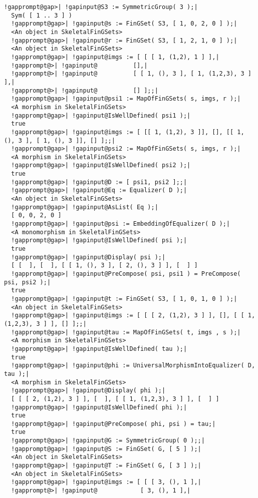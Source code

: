 \documentclass[a4paper,11pt]{report}
\begin{document}
{{{\begin{Verbatim}[commandchars=!@|,fontsize=\small,frame=single,label=Example]
  !gapprompt@gap>| !gapinput@S3 := SymmetricGroup( 3 );|
  Sym( [ 1 .. 3 ] )
  !gapprompt@gap>| !gapinput@s := FinGSet( S3, [ 1, 0, 2, 0 ] );|
  <An object in SkeletalFinGSets>
  !gapprompt@gap>| !gapinput@r := FinGSet( S3, [ 1, 2, 1, 0 ] );|
  <An object in SkeletalFinGSets>
  !gapprompt@gap>| !gapinput@imgs := [ [ [ 1, (1,2), 1 ] ],|
  !gapprompt@>| !gapinput@          [],|
  !gapprompt@>| !gapinput@          [ [ 1, (), 3 ], [ 1, (1,2,3), 3 ] ],|
  !gapprompt@>| !gapinput@          [] ];;|
  !gapprompt@gap>| !gapinput@psi1 := MapOfFinGSets( s, imgs, r );|
  <A morphism in SkeletalFinGSets>
  !gapprompt@gap>| !gapinput@IsWellDefined( psi1 );|
  true
  !gapprompt@gap>| !gapinput@imgs := [ [[ 1, (1,2), 3 ]], [], [[ 1, (), 3 ], [ 1, (), 3 ]], [] ];;|
  !gapprompt@gap>| !gapinput@psi2 := MapOfFinGSets( s, imgs, r );|
  <A morphism in SkeletalFinGSets>
  !gapprompt@gap>| !gapinput@IsWellDefined( psi2 );|
  true
  !gapprompt@gap>| !gapinput@D := [ psi1, psi2 ];;|
  !gapprompt@gap>| !gapinput@Eq := Equalizer( D );|
  <An object in SkeletalFinGSets>
  !gapprompt@gap>| !gapinput@AsList( Eq );|
  [ 0, 0, 2, 0 ]
  !gapprompt@gap>| !gapinput@psi := EmbeddingOfEqualizer( D );|
  <A monomorphism in SkeletalFinGSets>
  !gapprompt@gap>| !gapinput@IsWellDefined( psi );|
  true
  !gapprompt@gap>| !gapinput@Display( psi );|
  [ [  ], [  ], [ [ 1, (), 3 ], [ 2, (), 3 ] ], [  ] ]
  !gapprompt@gap>| !gapinput@PreCompose( psi, psi1 ) = PreCompose( psi, psi2 );|
  true
  !gapprompt@gap>| !gapinput@t := FinGSet( S3, [ 1, 0, 1, 0 ] );|
  <An object in SkeletalFinGSets>
  !gapprompt@gap>| !gapinput@imgs := [ [ [ 2, (1,2), 3 ] ], [], [ [ 1, (1,2,3), 3 ] ], [] ];;|
  !gapprompt@gap>| !gapinput@tau := MapOfFinGSets( t, imgs , s );|
  <A morphism in SkeletalFinGSets>
  !gapprompt@gap>| !gapinput@IsWellDefined( tau );|
  true
  !gapprompt@gap>| !gapinput@phi := UniversalMorphismIntoEqualizer( D, tau );|
  <A morphism in SkeletalFinGSets>
  !gapprompt@gap>| !gapinput@Display( phi );|
  [ [ [ 2, (1,2), 3 ] ], [  ], [ [ 1, (1,2,3), 3 ] ], [  ] ]
  !gapprompt@gap>| !gapinput@IsWellDefined( phi );|
  true
  !gapprompt@gap>| !gapinput@PreCompose( phi, psi ) = tau;|
  true
  !gapprompt@gap>| !gapinput@G := SymmetricGroup( 0 );;|
  !gapprompt@gap>| !gapinput@S := FinGSet( G, [ 5 ] );|
  <An object in SkeletalFinGSets>
  !gapprompt@gap>| !gapinput@T := FinGSet( G, [ 3 ] );|
  <An object in SkeletalFinGSets>
  !gapprompt@gap>| !gapinput@imgs := [ [ [ 3, (), 1 ],|
  !gapprompt@>| !gapinput@            [ 3, (), 1 ],|

\end{Verbatim}}}}
\end{document}
